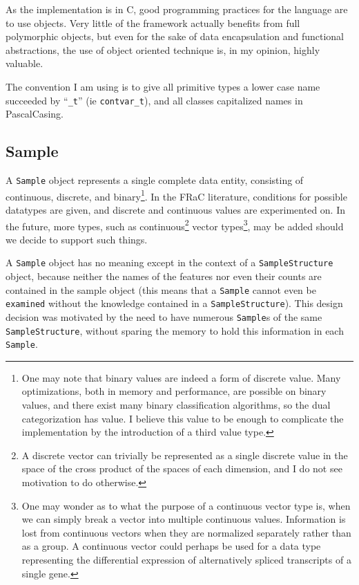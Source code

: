 \documentclass{article}
\newcommand{\CC}{C\nolinebreak\hspace{-.05em}\raisebox{.4ex}{\tiny\bf +}\nolinebreak\hspace{-.10em}\raisebox{.4ex}{\tiny\bf +}}
\begin{document}
\begin{multicols}{2}

As the implementation is in \CC{}, good programming practices for the language are to use objects.  Very little of the framework actually benefits from full polymorphic objects, but even for the sake of data encapsulation and functional abstractions, the use of object oriented technique is, in my opinion, highly valuable.

The convention I am using is to give all primitive types a lower case name succeeded by ``\texttt{\_t}'' (ie \texttt{contvar\_t}), and all classes capitalized names in PascalCasing.

\color{textcol}

\subsection{Sample}

A \texttt{Sample} object represents a single complete data entity, consisting of continuous, discrete, and binary\footnote{One may note that binary values are indeed a form of discrete value.  Many optimizations, both in memory and performance, are possible on binary values, and there exist many binary classification algorithms, so the dual categorization has value.  I believe this value to be enough to complicate the implementation by the introduction of a third value type.}.  In the FRaC literature, conditions for possible datatypes are given, and discrete and continuous values are experimented on.  In the future, more types, such as continuous\footnote{A discrete vector can trivially be represented as a single discrete value in the space of the cross product of the spaces of each dimension, and I do not see motivation to do otherwise.} vector types\footnote{One may wonder as to what the purpose of a continuous vector type is, when we can simply break a vector into multiple continuous values.  Information is lost from continuous vectors when they are normalized separately rather than as a group.  A continuous vector could perhaps be used for a data type representing the differential expression of alternatively spliced transcripts of a single gene.}, may be added should we decide to support such things.

A \texttt{Sample} object has no meaning except in the context of a \texttt{SampleStructure} object, because neither the names of the features nor even their counts are contained in the sample object (this means that a \texttt{Sample} cannot even be \texttt{examined} without the knowledge contained in a \texttt{SampleStructure}).  This design decision was motivated by the need to have numerous \texttt{Sample}s of the same \texttt{SampleStructure}, without sparing the memory to hold this information in each \texttt{Sample}.


\end{multicols}
\end{document}
